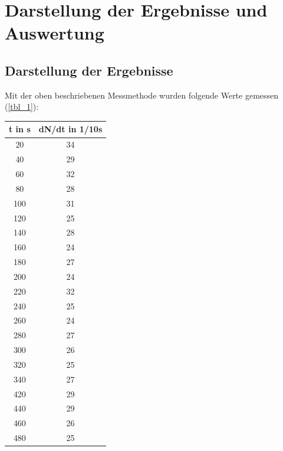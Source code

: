 \section{Darstellung der Ergebnisse und Auswertung}

\subsection{Darstellung der Ergebnisse}
Mit der oben beschriebenen Messmethode wurden folgende Werte gemessen (\ref{tbl_1}):
\begin{table}
\centering
\begin{tabular}{c|c}
t in s & dN/dt in 1/10s \\ 
\toprule
20	&34\\ 

40	&29\\ 

60	&32\\ 

80	&28\\ 

100	&31\\ 

120	&25\\ 

140	&28\\ 

160	&24\\ 

180	&27\\ 

200	&24\\ 

220	&32\\ 

240	&25\\ 

260	&24\\ 

280	&27\\ 
	
300	&26\\ 

320	&25\\ 

340	&27\\ 

420	&29\\ 
	
440	&29\\ 

460	&26\\ 

480	&25\\ 


\end{tabular}
\end{table}
